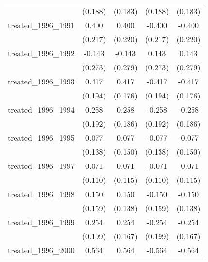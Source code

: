 {\begin{tabular}{l*{4}{c}}
            &     (0.188)         &     (0.183)         &     (0.188)         &     (0.183)         \\
[1em]
treated\_1996\_1991&       0.400         &       0.400         &      -0.400         &      -0.400         \\
            &     (0.217)         &     (0.220)         &     (0.217)         &     (0.220)         \\
[1em]
treated\_1996\_1992&      -0.143         &      -0.143         &       0.143         &       0.143         \\
            &     (0.273)         &     (0.279)         &     (0.273)         &     (0.279)         \\
[1em]
treated\_1996\_1993&       0.417\sym{*}  &       0.417\sym{*}  &      -0.417\sym{*}  &      -0.417\sym{*}  \\
            &     (0.194)         &     (0.176)         &     (0.194)         &     (0.176)         \\
[1em]
treated\_1996\_1994&       0.258         &       0.258         &      -0.258         &      -0.258         \\
            &     (0.192)         &     (0.186)         &     (0.192)         &     (0.186)         \\
[1em]
treated\_1996\_1995&       0.077         &       0.077         &      -0.077         &      -0.077         \\
            &     (0.138)         &     (0.150)         &     (0.138)         &     (0.150)         \\
[1em]
treated\_1996\_1997&       0.071         &       0.071         &      -0.071         &      -0.071         \\
            &     (0.110)         &     (0.115)         &     (0.110)         &     (0.115)         \\
[1em]
treated\_1996\_1998&       0.150         &       0.150         &      -0.150         &      -0.150         \\
            &     (0.159)         &     (0.138)         &     (0.159)         &     (0.138)         \\
[1em]
treated\_1996\_1999&       0.254         &       0.254         &      -0.254         &      -0.254         \\
            &     (0.199)         &     (0.167)         &     (0.199)         &     (0.167)         \\
[1em]
treated\_1996\_2000&       0.564\sym{**} &       0.564\sym{**} &      -0.564\sym{**} &      -0.564\sym{**} \\

\end{tabular}}
